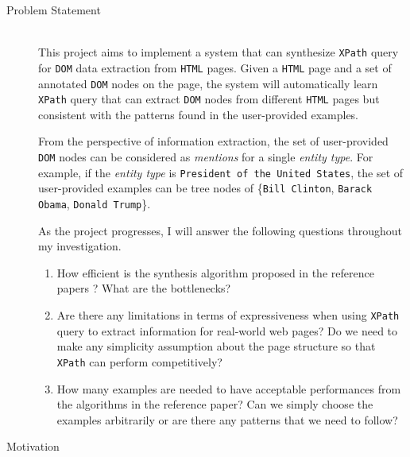 \documentclass[12pt,a4paper]{article}
\begin{document}
\begin{description}
    \item[Problem Statement]\text{}\\
    This project aims to implement a system that can synthesize \texttt{XPath} query for \texttt{DOM} data extraction from \texttt{HTML} pages. Given a \texttt{HTML} page and a set of annotated \texttt{DOM} nodes on the page, the system will automatically learn \texttt{XPath} query that can extract \texttt{DOM} nodes from different \texttt{HTML} pages but consistent with the patterns found in the user-provided examples.   
    
    From the perspective of information extraction, the set of user-provided \texttt{DOM} nodes can be considered as \textit{mentions} for a single \textit{entity type}. For example, if the \textit{entity type} is \texttt{President of the United States}, the set of user-provided examples can be tree nodes of \{\texttt{Bill Clinton}, \texttt{Barack Obama}, \texttt{Donald Trump}\}. 
    
    As the project progresses, I will answer the following questions throughout my investigation.
    \begin{enumerate}[label=(\alph*)]
        \item How efficient is the synthesis algorithm proposed in the reference papers \cite{Anton2005XPathWrapperIB}? What are the bottlenecks? 
        \item Are there any limitations in terms of expressiveness when using \texttt{XPath} query to extract information for real-world web pages? Do we need to make any simplicity assumption about the page structure so that \texttt{XPath} can perform competitively?
        \item How many examples are needed to have acceptable performances from the algorithms in the reference paper? Can we simply choose the examples arbitrarily or are there any patterns that we need to follow? 
    \end{enumerate}
       
    \item[Motivation]\text{}\\
    

\end{description}
\end{document}

